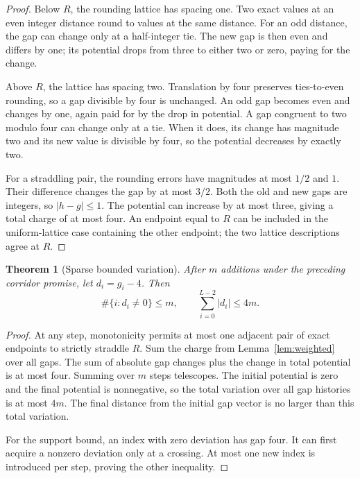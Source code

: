 \documentclass[11pt,reqno]{amsart}
\newtheorem{theorem}{Theorem}[section]
\theoremstyle{definition}
\theoremstyle{remark}
\numberwithin{equation}{section}
\begin{document}
\begin{proof}
Below $R$, the rounding lattice has spacing one. Two exact values at
an even integer distance round to values at the same distance. For an
odd distance, the gap can change only at a half-integer tie. The new
gap is then even and differs by one; its potential drops from three
to either two or zero, paying for the change.

Above $R$, the lattice has spacing two. Translation by four preserves
ties-to-even rounding, so a gap divisible by four is unchanged. An odd
gap becomes even and changes by one, again paid for by the drop in
potential. A gap congruent to two modulo four can change only at a tie.
When it does, its change has magnitude two and its new value is
divisible by four, so the potential decreases by exactly two.

For a straddling pair, the rounding errors have magnitudes at most
$1/2$ and $1$. Their difference changes the gap by at most $3/2$.
Both the old and new gaps are integers, so $|h-g|\leq 1$. The
potential can increase by at most three, giving a total charge of at
most four. An endpoint equal to $R$ can be included in the
uniform-lattice case containing the other endpoint; the two lattice
descriptions agree at $R$.
\end{proof}

\begin{theorem}[Sparse bounded variation]
\label{thm:variation}
After $m$ additions under the preceding corridor promise, let
$d_i=g_i-4$. Then
\begin{equation}
\label{eq:variation-budget}
 \#\{i:d_i\neq 0\}\leq m,
 \qquad
 \sum_{i=0}^{L-2}|d_i|\leq 4m.
\end{equation}
\end{theorem}

\begin{proof}
At any step, monotonicity permits at most one adjacent pair of exact
endpoints to strictly straddle $R$. Sum the charge from
Lemma~\ref{lem:weighted} over all gaps. The sum of absolute gap changes
plus the change in total potential is at most four. Summing over $m$
steps telescopes. The initial potential is zero and the final potential
is nonnegative, so the total variation over all gap histories is at
most $4m$. The final distance from the initial gap vector is no larger
than this total variation.

For the support bound, an index with zero deviation has gap four. It
can first acquire a nonzero deviation only at a crossing. At most one
new index is introduced per step, proving the other inequality.
\end{proof}
\end{document}
